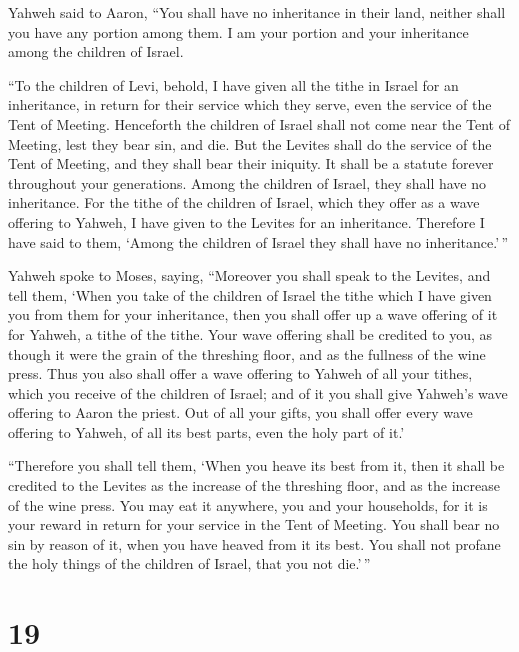  Yahweh said to Aaron, ``You shall have no inheritance in
their land, neither shall you have any portion among them. I am your
portion and your inheritance among the children of Israel.

 ``To the children of Levi, behold, I have given all the
tithe in Israel for an inheritance, in return for their service which
they serve, even the service of the Tent of Meeting. 
Henceforth the children of Israel shall not come near the Tent of
Meeting, lest they bear sin, and die.  But the Levites
shall do the service of the Tent of Meeting, and they shall bear their
iniquity. It shall be a statute forever throughout your generations.
Among the children of Israel, they shall have no inheritance.
 For the tithe of the children of Israel, which they offer
as a wave offering to Yahweh, I have given to the Levites for an
inheritance. Therefore I have said to them, `Among the children of
Israel they shall have no inheritance.'\,''

 Yahweh spoke to Moses, saying,  ``Moreover
you shall speak to the Levites, and tell them, `When you take of the
children of Israel the tithe which I have given you from them for your
inheritance, then you shall offer up a wave offering of it for Yahweh, a
tithe of the tithe.  Your wave offering shall be credited
to you, as though it were the grain of the threshing floor, and as the
fullness of the wine press.  Thus you also shall offer a
wave offering to Yahweh of all your tithes, which you receive of the
children of Israel; and of it you shall give Yahweh's wave offering to
Aaron the priest.  Out of all your gifts, you shall offer
every wave offering to Yahweh, of all its best parts, even the holy part
of it.'

 ``Therefore you shall tell them, `When you heave its best
from it, then it shall be credited to the Levites as the increase of the
threshing floor, and as the increase of the wine press. 
You may eat it anywhere, you and your households, for it is your reward
in return for your service in the Tent of Meeting.  You
shall bear no sin by reason of it, when you have heaved from it its
best. You shall not profane the holy things of the children of Israel,
that you not die.'\,''

\hypertarget{section-18}{%
\section{19}\label{section-18}}

